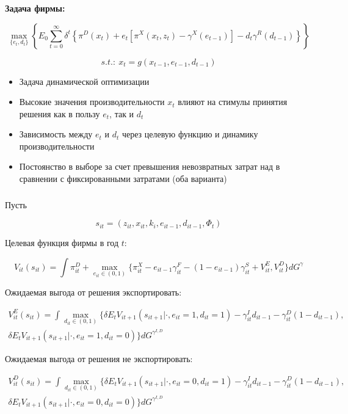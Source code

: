 \documentclass[c, dvipsnames]{beamer}  %
\begin{document}
\begin{frame}[shrink=3]
\frametitle{\insertsection} 


\textbf{Задача фирмы:}


$$ \max_{\{e_{t},d_{t}\}} \left\{ E_0 \sum^\infty_{t=0} \delta^t \left\{ \pi^D(x_t) +e_t [\pi^X(x_t,z_t)-\gamma^X(e_{t-1})] -d_t\gamma^R(d_{t-1})\right\}\right\}$$

$$s.t.: \  x_t = g(x_{t−1}, e_{t−1}, d_{t−1})$$


\begin{itemize}
	\item Задача динамической  оптимизации 
	\item Высокие значения производительности    $x_t$   влияют на стимулы принятия решения  как в пользу   $e_t$, так и $d_t$
	\item Зависимость между  $e_t$  и  $d_t$   через целевую функцию и динамику производительности
	\item 
	Постоянство в выборе за счет превышения невозвратных затрат над в сравнении с фиксированными затратами (оба варианта)

	
\end{itemize}
\end{frame}




\begin{frame}[shrink=3]
\frametitle{\insertsection} 

Пусть

$$s_{it} = (z_{it},x_{it},k_{i },e_{it-1},d_{it-1}, \Phi_{t})$$


Целевая функция фирмы в год $t$: 

$$V_{it}(s_{it})=\int \pi_{it}^D + \max_{e_{it} \in (0,1)} \{ \pi_{it}^X-e_{it-1}\gamma_{it}^F-(1-e_{it-1})\gamma_{it}^S+ V_{it}^E, V_{it}^D  \} dG^{\gamma}$$


Ожидаемая выгода от решения экспортировать:

\begin{multline}\label{key}
V_{it}^E(s_{it})=\int  \max_{d_{it} \in (0,1)} \{ \delta E_t V_{it+1} (s_{it+1}| \cdot, e_{it} = 1, d_{it} = 1 ) - \gamma_{it}^I d_{it-1} - \gamma_{it}^D (1- d_{it-1}), \\  \delta E_t V_{it+1} (s_{it+1}| \cdot, e_{it} = 1, d_{it} = 0) \} dG^{\gamma^{I,D}}
\end{multline}

Ожидаемая выгода от решения не экспортировать:


\begin{multline}\label{key}
V_{it}^D(s_{it})=\int  \max_{d_{it} \in (0,1)} \{ \delta E_t V_{it+1} (s_{it+1}| \cdot, e_{it} = 0, d_{it} = 1 ) - \gamma_{it}^I d_{it-1} - \gamma_{it}^D (1- d_{it-1}), \\ \delta E_t V_{it+1} (s_{it+1}| \cdot, e_{it} = 0, d_{it} = 0) \} dG^{\gamma^{I,D}}
\end{multline}



\end{frame}
\end{document}
